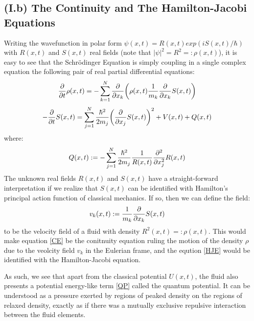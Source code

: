 \documentclass[11pt, a4paper]{article} %
\begin{document}
\subsection*{(I.b) The Continuity and The Hamilton-Jacobi Equations}
Writing the wavefunction in polar form $\psi(x,t)=R(x,t)exp(iS(x,t)/\hbar)$ with $R(x,t)$ and $S(x,t)$ real fields (note that $|\psi|^2=R^2=:\rho(x,t)$), it is easy to see that the Schrödinger Equation is simply coupling in a single complex equation the following pair of real partial differential equations:
\begin{equation}\label{CE}
\pdv{}{t} \rho(x,t)=-\sum_{k=1}^N \pdv{}{x_k}\qty( \rho(x,t)\frac{1}{m_k}\pdv{}{x_k} S(x,t) )
\end{equation}
\begin{equation}\label{HJE}
-\pdv{}{t}S(x,t) = \sum_{j=1}^N \frac{\hbar^2}{2m_j} \qty(\pdv{}{x_j} S(x,t) )^2+ V(x,t)+Q(x,t)
\end{equation}
where:
\begin{equation}\label{QP}
Q(x,t):=-\sum_{j=1}^N \frac{\hbar^2}{2m_j}\frac{1}{R(x,t)}\pdv[2]{}{x_j} R(x,t)
\end{equation}
The unknown real fields $R(x,t)$ and $S(x,t)$ have a straight-forward interpretation if we realize that $S(x,t)$ can be identified with Hamilton's principal action function of classical mechanics. If so, then we can define the field:%
\begin{equation}
v_k(x,t):=\frac{1}{m_k}\pdv{}{x_k}S(x,t)
\end{equation}
to be the velocity field of a fluid with density $R^2(x,t)=:\rho(x,t)$. This would make equation \eqref{CE} be the conitnuity equation ruling the motion of the density $\rho$ due to the veolcity field $v_k$ in the Eulerian frame, and the eqution \eqref{HJE} would be identified with the Hamilton-Jacobi equation. 

As such, we see that apart from the classical potential $U(x,t)$, the fluid also presents a potential energy-like term \eqref{QP} called the quantum potential. It can be understood as a pressure exerted by regions of peaked density on the regions of relaxed density, exactly as if there was a mutually exclusive repulsive interaction between the fluid elements. 
\end{document}
